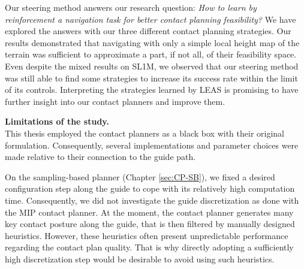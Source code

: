 

Our steering method answers our research question: \textit{How to learn by reinforcement a navigation task for better contact planning feasibility?}
We have explored the answers with our three different contact planning strategies.
Our results demonstrated that navigating with only a simple local height map of the terrain was sufficient to approximate a part, if not all, of their feasibility space.
Even despite the mixed results on SL1M, we observed that our steering method was still able to find some strategies to increase its success rate within the limit of its controls.
Interpreting the strategies learned by LEAS is promising to have further insight into our contact planners and improve them.


\hfill \break

\noindent\textbf{Limitations of the study.}\\

This thesis employed the contact planners as a black box with their original formulation. Consequently, several implementations and parameter choices were made relative to their connection to the guide path.

On the sampling-based planner (Chapter \ref{sec:CP-SB}), we fixed a desired configuration step along the guide to cope with its relatively high computation time. 
Consequently, we did not investigate the guide discretization as done with the MIP contact planner.
At the moment, the contact planner generates many key contact posture along the guide, that is then filtered by manually designed heuristics. 
However, these heuristics often present unpredictable performance regarding the contact plan quality.
That is why directly adopting a sufficiently high discretization step would be desirable to avoid using such heuristics.

